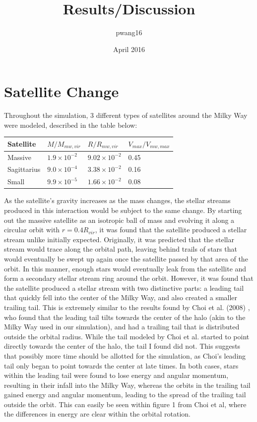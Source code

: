 \documentclass{article}
\title{Results/Discussion}
\author{pwang16 }
\date{April 2016}
\begin{document}
\maketitle

\section{Satellite Change}
Throughout the simulation, 3 different types of satellites around the Milky Way were modeled, described in the table below:

\begin{center}
	\begin{tabular}{| l | l | l | l | }
		\hline Satellite & $M/M_{mw, vir}$ & $R/R_{mw, vir}$ & $V_{max}/V_{mw, max}$ \\ \hline
		Massive & $1.9 \times 10^{-2}$ & $9.02 \times 10^{-2}$ & 0.45 \\ \hline
		Sagittarius & $9.0 \times 10^{-4}$ & $3.38 \times 10^{-2}$ & 0.16 \\ \hline
		Small & $9.9 \times 10^{-5}$ & $1.66 \times 10^{-2}$ & 0.08 \\ \hline
	\end{tabular}
\end{center}

As the satellite's gravity increases as the mass changes, the stellar streams produced in this interaction would be subject to the same change. By starting out the massive satellite as an isotropic ball of mass and evolving it along a circular orbit with $r = 0.4R_{vir}$, it was found that the satellite produced a stellar stream unlike initially expected. Originally, it was predicted that the stellar stream would trace along the orbital path, leaving behind trails of stars that would eventually be swept up again once the satellite passed by that area of the orbit. In this manner, enough stars would eventually leak from the satellite and form a secondary stellar stream ring around the orbit. However, it was found that the satellite produced a stellar stream with two distinctive parts: a leading tail that quickly fell into the center of the Milky Way, and also created a smaller trailing tail. This is extremely similar to the results found by Choi et al. (2008) \cite{dymanicsOfTidalTails}, who found that the leading tail tilts towards the center of the halo (akin to the Milky Way used in our simulation), and had a trailing tail that is distributed outside the orbital radius. While the tail modeled by Choi et al. started to point directly towards the center of the halo, the tail I found did not. This suggests that possibly more time should be allotted for the simulation, as Choi's leading tail only began to point towards the center at late times. In both cases, stars within the leading tail were found to lose energy and angular momentum, resulting in their infall into the Milky Way, whereas the orbits in the trailing tail gained energy and angular momentum, leading to the spread of the trailing tail outside the orbit. This can easily be seen within figure 1 from Choi et al, where the differences in energy are clear within the orbital rotation. 
\end{document}

